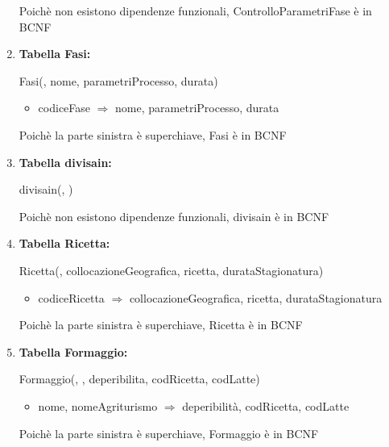 \documentclass[12pt,a4paper]{article}
\begin{document}
\begin{enumerate}
Poichè non esistono dipendenze funzionali, ControlloParametriFase è in BCNF
\vspace{10pt}



\item[] \textbf{Tabella Fasi:}

Fasi(\underline{}, nome, parametriProcesso, durata)
\begin{itemize}
\vspace{-5pt}
\item codiceFase $\Rightarrow$ nome, parametriProcesso, durata
\vspace{-5pt}
\end{itemize}
Poichè la parte sinistra è superchiave, Fasi è in BCNF
\vspace{10pt}



\item[] \textbf{Tabella divisain:}

divisain(\underline{}, \underline{})

Poichè non esistono dipendenze funzionali, divisain è in BCNF
\vspace{10pt}



\item[] \textbf{Tabella Ricetta:}

Ricetta(\underline{}, collocazioneGeografica, ricetta, durataStagionatura)
\begin{itemize}
\vspace{-5pt}
\item codiceRicetta $\Rightarrow$ collocazioneGeografica, ricetta, durataStagionatura
\vspace{-5pt}
\end{itemize}
Poichè la parte sinistra è superchiave, Ricetta è in BCNF
\vspace{10pt}



\item[] \textbf{Tabella Formaggio:}

Formaggio(\underline{}, \underline{}, deperibilita,  codRicetta,  codLatte)
\begin{itemize}
\vspace{-5pt}
\item nome, nomeAgriturismo $\Rightarrow$ deperibilità, codRicetta, codLatte
\vspace{-5pt}
\end{itemize}
Poichè la parte sinistra è superchiave, Formaggio è in BCNF
\vspace{10pt}




\end{enumerate}
\end{document}
